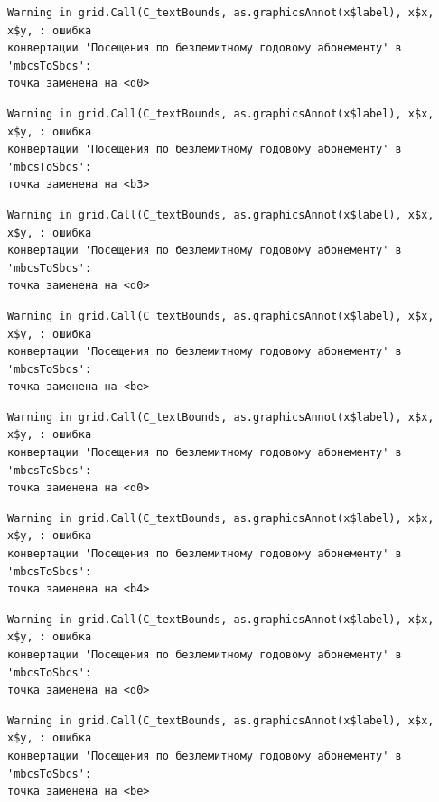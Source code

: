 \documentclass[
  letterpaper,
  DIV=11,
  numbers=noendperiod]{scrreprt}
\begin{document}
\begin{verbatim}
Warning in grid.Call(C_textBounds, as.graphicsAnnot(x$label), x$x, x$y, : ошибка
конвертации 'Посещения по безлемитному годовому абонементу' в 'mbcsToSbcs':
точка заменена на <d0>
\end{verbatim}

\begin{verbatim}
Warning in grid.Call(C_textBounds, as.graphicsAnnot(x$label), x$x, x$y, : ошибка
конвертации 'Посещения по безлемитному годовому абонементу' в 'mbcsToSbcs':
точка заменена на <b3>
\end{verbatim}

\begin{verbatim}
Warning in grid.Call(C_textBounds, as.graphicsAnnot(x$label), x$x, x$y, : ошибка
конвертации 'Посещения по безлемитному годовому абонементу' в 'mbcsToSbcs':
точка заменена на <d0>
\end{verbatim}

\begin{verbatim}
Warning in grid.Call(C_textBounds, as.graphicsAnnot(x$label), x$x, x$y, : ошибка
конвертации 'Посещения по безлемитному годовому абонементу' в 'mbcsToSbcs':
точка заменена на <be>
\end{verbatim}

\begin{verbatim}
Warning in grid.Call(C_textBounds, as.graphicsAnnot(x$label), x$x, x$y, : ошибка
конвертации 'Посещения по безлемитному годовому абонементу' в 'mbcsToSbcs':
точка заменена на <d0>
\end{verbatim}

\begin{verbatim}
Warning in grid.Call(C_textBounds, as.graphicsAnnot(x$label), x$x, x$y, : ошибка
конвертации 'Посещения по безлемитному годовому абонементу' в 'mbcsToSbcs':
точка заменена на <b4>
\end{verbatim}

\begin{verbatim}
Warning in grid.Call(C_textBounds, as.graphicsAnnot(x$label), x$x, x$y, : ошибка
конвертации 'Посещения по безлемитному годовому абонементу' в 'mbcsToSbcs':
точка заменена на <d0>
\end{verbatim}

\begin{verbatim}
Warning in grid.Call(C_textBounds, as.graphicsAnnot(x$label), x$x, x$y, : ошибка
конвертации 'Посещения по безлемитному годовому абонементу' в 'mbcsToSbcs':
точка заменена на <be>
\end{verbatim}
\end{document}
